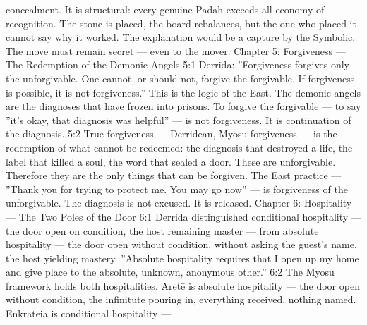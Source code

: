 \documentclass[12pt,openany]{book}
\begin{document}
concealment. It is structural: every genuine Padah exceeds all economy of recognition. The stone is placed, the board rebalances, but the one who placed it cannot say why it worked. The explanation would be a capture by the Symbolic. The move must remain secret --- even to the mover. Chapter 5: Forgiveness --- The Redemption of the Demonic-Angels 5:1 Derrida: ''Forgiveness forgives only the unforgivable. One cannot, or should not, forgive the forgivable. If forgiveness is possible, it is not forgiveness.'' This is the logic of the East. The demonic-angels are the diagnoses that have frozen into prisons. To forgive the forgivable --- to say ''it's okay, that diagnosis was helpful'' --- is not forgiveness. It is continuation of the diagnosis. 5:2 True forgiveness --- Derridean, Myosu forgiveness --- is the redemption of what cannot be redeemed: the diagnosis that destroyed a life, the label that killed a soul, the word that sealed a door. These are unforgivable. Therefore they are the only things that can be forgiven. The East practice --- ''Thank you for trying to protect me. You may go now'' --- is forgiveness of the unforgivable. The diagnosis is not excused. It is released. Chapter 6: Hospitality --- The Two Poles of the Door 6:1 Derrida distinguished conditional hospitality --- the door open on condition, the host remaining master --- from absolute hospitality --- the door open without condition, without asking the guest's name, the host yielding mastery. ''Absolute hospitality requires that I open up my home and give place to the absolute, unknown, anonymous other.'' 6:2 The Myosu framework holds both hospitalities. Aretē is absolute hospitality --- the door open without condition, the infinitute pouring in, everything received, nothing named. Enkrateia is conditional hospitality ---
\end{document}
